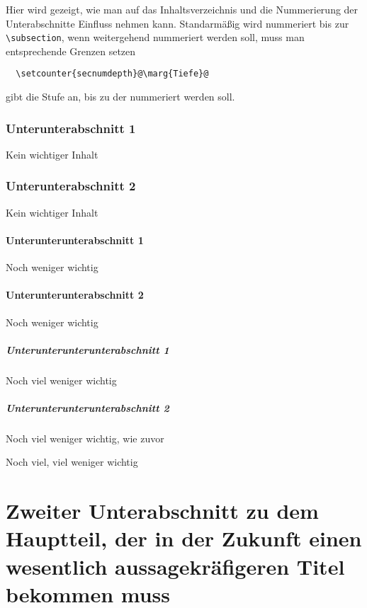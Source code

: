 \documentclass[ngerman,               %
               a4paper,               %
               fleqn,                 %
                     ]{scrartcl}       %
\begin{document}
Hier wird gezeigt, wie man auf das Inhaltsverzeichnis und die
Nummerierung der Unterabschnitte Einfluss nehmen kann. Standarmäßig
wird nummeriert bis zur \lstinline|\subsection|, wenn weitergehend
nummeriert werden soll, muss man entsprechende Grenzen setzen
\begin{lstlisting}
  \setcounter{secnumdepth}@\marg{Tiefe}@
\end{lstlisting}
 gibt die Stufe an, bis zu der nummeriert werden soll.

\subsubsection{Unterunterabschnitt 1}

Kein wichtiger Inhalt

\subsubsection{Unterunterabschnitt 2}

Kein wichtiger Inhalt

\paragraph{Unterunterunterabschnitt 1}

Noch weniger wichtig

\paragraph{Unterunterunterabschnitt 2}

Noch weniger wichtig

\subparagraph{Unterunterunterunterabschnitt 1}

Noch viel weniger wichtig


\subparagraph{Unterunterunterunterabschnitt 2}

Noch viel weniger wichtig, wie zuvor


Noch viel, viel weniger wichtig


\section[Zweiter Unterabschnitt]{Zweiter Unterabschnitt zu dem Hauptteil,
  der in der Zukunft einen wesentlich aussagekräfigeren Titel bekommen
  muss}
\end{document}
